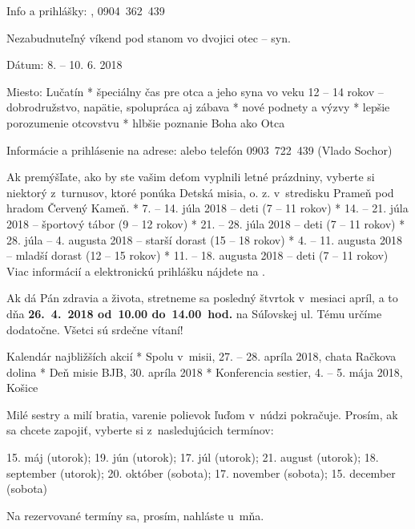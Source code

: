 \nobreak Info a prihlášky: , 0904~362~439


Nezabudnuteľný víkend pod stanom vo dvojici otec -- syn.

Dátum: 8. – 10. 6. 2018

Miesto: Lučatín
\begitems
* špeciálny čas pre otca a jeho syna vo veku 12 -- 14 rokov -- dobrodružstvo, napätie, spolupráca aj zábava
* nové podnety a výzvy
* lepšie porozumenie otcovstvu
* hlbšie poznanie Boha ako Otca
\enditems

Informácie a prihlásenie na adrese:  alebo telefón 0903~722~439 (Vlado Sochor)


Ak premýšľate, ako by ste vašim deťom vyplnili letné prázdniny, vyberte si niektorý z~turnusov, ktoré ponúka Detská misia, o. z. v~stredisku Prameň pod hradom Červený Kameň.
\begitems
* 7. -- 14. júla 2018 – deti (7 -- 11 rokov)
* 14. -- 21. júla 2018 – športový tábor (9 -- 12 rokov)
* 21. -- 28. júla 2018 – deti (7 -- 11 rokov)
* 28. júla -- 4. augusta 2018 – starší dorast (15 -- 18 rokov)
* 4. -- 11. augusta 2018 – mladší dorast (12 -- 15 rokov)
* 11. -- 18. augusta 2018 – deti (7 -- 11 rokov)
\enditems
Viac informácií a elektronickú prihlášku nájdete na .



Ak dá Pán zdravia a života, stretneme sa posledný štvrtok v~mesiaci apríl, a to dňa {\bf 26.~4.~2018 od~10.00 do~14.00~hod.} na Súľovskej ul. Tému určíme dodatočne. Všetci sú srdečne vítaní!



\clanok Kalendár najbližších akcií
\begitems
* Spolu v~misii, 27. -- 28. apríla 2018, chata Račkova dolina
* Deň misie BJB, 30. apríla 2018
* Konferencia sestier, 4. -- 5. mája 2018, Košice
\enditems


Milé sestry a milí bratia, varenie polievok ľuďom v~núdzi pokračuje. Prosím, ak sa chcete zapojiť, vyberte si z~nasledujúcich termínov:

15. máj (utorok); 19. jún (utorok); 17. júl (utorok); 21. august (utorok); 18. september (utorok); 20. október (sobota); 17. november (sobota); 15. december (sobota)

Na rezervované termíny sa, prosím, nahláste u~mňa.



